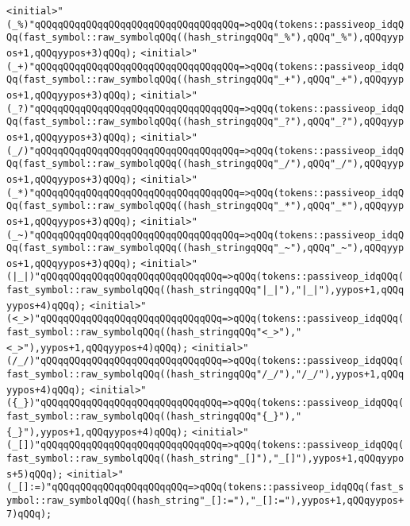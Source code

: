 \verb|<initial>"(_%)"qQQqqQQqqQQqqQQqqQQqqQQqqQQqqQQqqQQq=>qQQq(tokens::passiveop_idqQQq(fast_symbol::raw_symbolqQQq((hash_stringqQQq"_%"),qQQq"_%"),qQQqyypos+1,qQQqyypos+3)qQQq);|\newline
\verb|<initial>"(_+)"qQQqqQQqqQQqqQQqqQQqqQQqqQQqqQQqqQQq=>qQQq(tokens::passiveop_idqQQq(fast_symbol::raw_symbolqQQq((hash_stringqQQq"_+"),qQQq"_+"),qQQqyypos+1,qQQqyypos+3)qQQq);|\newline
\verb|<initial>"(_?)"qQQqqQQqqQQqqQQqqQQqqQQqqQQqqQQqqQQq=>qQQq(tokens::passiveop_idqQQq(fast_symbol::raw_symbolqQQq((hash_stringqQQq"_?"),qQQq"_?"),qQQqyypos+1,qQQqyypos+3)qQQq);|\newline
\verb|<initial>"(_/)"qQQqqQQqqQQqqQQqqQQqqQQqqQQqqQQqqQQq=>qQQq(tokens::passiveop_idqQQq(fast_symbol::raw_symbolqQQq((hash_stringqQQq"_/"),qQQq"_/"),qQQqyypos+1,qQQqyypos+3)qQQq);|\newline
\verb|<initial>"(_*)"qQQqqQQqqQQqqQQqqQQqqQQqqQQqqQQqqQQq=>qQQq(tokens::passiveop_idqQQq(fast_symbol::raw_symbolqQQq((hash_stringqQQq"_*"),qQQq"_*"),qQQqyypos+1,qQQqyypos+3)qQQq);|\newline
\verb|<initial>"(_~)"qQQqqQQqqQQqqQQqqQQqqQQqqQQqqQQqqQQq=>qQQq(tokens::passiveop_idqQQq(fast_symbol::raw_symbolqQQq((hash_stringqQQq"_~"),qQQq"_~"),qQQqyypos+1,qQQqyypos+3)qQQq);|\newline
\verb|<initial>"(|\verb#|_|)"qQQqqQQqqQQqqQQqqQQqqQQqqQQqqQQq=>qQQq(tokens::passiveop_idqQQq(fast_symbol::raw_symbolqQQq((hash_stringqQQq"|_|"),"|_|"),yypos+1,qQQqyypos+4)qQQq);#\newline
\verb|<initial>"(<_>)"qQQqqQQqqQQqqQQqqQQqqQQqqQQqqQQq=>qQQq(tokens::passiveop_idqQQq(fast_symbol::raw_symbolqQQq((hash_stringqQQq"<_>"),"<_>"),yypos+1,qQQqyypos+4)qQQq);|\newline
\verb|<initial>"(/_/)"qQQqqQQqqQQqqQQqqQQqqQQqqQQqqQQq=>qQQq(tokens::passiveop_idqQQq(fast_symbol::raw_symbolqQQq((hash_stringqQQq"/_/"),"/_/"),yypos+1,qQQqyypos+4)qQQq);|\newline
\verb|<initial>"({_})"qQQqqQQqqQQqqQQqqQQqqQQqqQQqqQQq=>qQQq(tokens::passiveop_idqQQq(fast_symbol::raw_symbolqQQq((hash_stringqQQq"{_}"),"{_}"),yypos+1,qQQqyypos+4)qQQq);|\newline
\verb|<initial>"(_[])"qQQqqQQqqQQqqQQqqQQqqQQqqQQqqQQq=>qQQq(tokens::passiveop_idqQQq(fast_symbol::raw_symbolqQQq((hash_string"_[]"),"_[]"),yypos+1,qQQqyypos+5)qQQq);|\newline
\verb|<initial>"(_[]:=)"qQQqqQQqqQQqqQQqqQQqqQQq=>qQQq(tokens::passiveop_idqQQq(fast_symbol::raw_symbolqQQq((hash_string"_[]:="),"_[]:="),yypos+1,qQQqyypos+7)qQQq);|\newline
